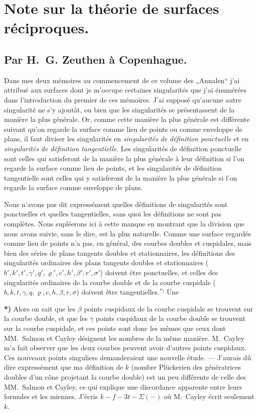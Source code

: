 \documentclass{article}
\begin{document}
\section*{Note sur la théorie de surfaces réciproques.}

\subsection*{Par H.~G. Zeuthen à Copenhague.}

Dans mes deux mémoires au commencement de ce volume des „Annalen“ j'ai attribué aux surfaces dont je m'occupe certaines singularités que j'ai énumérées dans l'introduction du premier de ces mémoires. J'ai supposé qu'aucune autre singularité ne s'y ajoutât, ou bien que les singularités se présentassent de la manière la plus générale. Or, comme cette manière la plus générale est différente suivant qu'on regarde la surface comme lieu de points ou comme enveloppe de plans, il faut diviser les singularités en \emph{singularités de définition ponctuelle} et en \emph{singularités de définition tangentielle}. Les singularités de définition ponctuelle sont celles qui satisferont de la manière la plus générale à leur définition si l'on regarde la surface comme lieu de points, et les singularités de définition tangentielle sont celles qui y satisferont de la manière la plus générale si l'on regarde la surface comme enveloppe de plans.

Nous n'avons pas dit expressément quelles définitions de singularités sont ponctuelles et quelles tangentielles, sans quoi les définitions ne sont pas complètes. Nous supléerons ici à cette manque en montrant que la division que nous avons suivie, sans le dire, est la plus naturelle. Comme une surface regardée comme lieu de points n'a pas, en général, des courbes doubles et cuspidales, mais bien des séries de plans tangents doubles et stationnaires, les définitions des singularités ordinaires des plans tangents doubles et stationnaires ($b', k', t', \gamma', q', \varrho', c', h', \beta', r', \sigma'$) doivent être ponctuelles, et celles des singularités ordinaires de la courbe double et de la courbe cuspidale ($b, k, t, \gamma, q, \varrho, c, h, \beta, r, \sigma$) doivent être tangentielles.${}^{*)}$ Une

\textbf{*)} Alors on sait que les $\beta$ points cuspidaux de la courbe cuspidale se trouvent sur la courbe double, et que les $\gamma$ points cuspidaux de la courbe double se trouvent sur la courbe cuspidale, et ces points sont donc les mêmes que ceux dont MM.~Salmon et Cayley désignent les nombres de la même manière. M.~Cayley m'a fait observer que les deux courbes peuvent avoir d'autres points cuspidaux. Ces nouveaux points singuliers demanderaient une nouvelle étude. --- J'aurais dû dire expressément que ma définition de $k$ (nombre Plückerien des génératrices doubles d'un cône projetant la courbe double) est un peu différente de celle des MM.~Salmon et Cayley, ce qui explique une discordance apparente entre leurs formules et les miennes. J'écris $k - f - 3t - \Sigma(\cdots)$ où M.~Cayley écrit seulement $k$.
\end{document}

